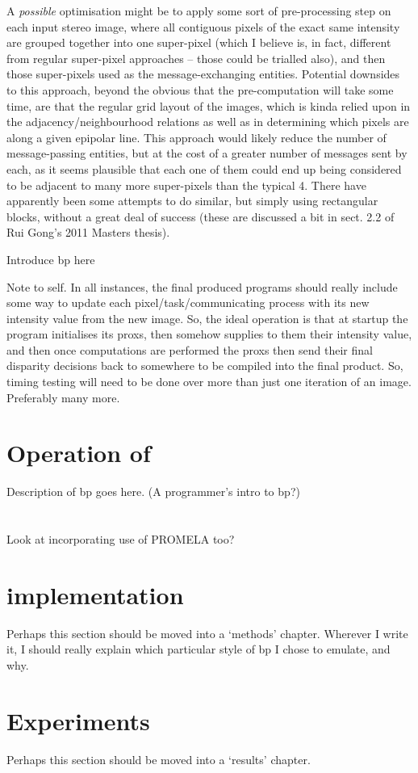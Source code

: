 A \emph{possible} optimisation might be to apply some sort of pre-processing step on each input stereo image, where all contiguous pixels of the exact same intensity are grouped together into one super-pixel (which I believe is, in fact, different from regular super-pixel approaches -- those could be trialled also), and then those super-pixels used as the message-exchanging entities.  Potential downsides to this approach, beyond the obvious that the pre-computation will take some time, are that the regular grid layout of the images, which is kinda relied upon in the adjacency/neighbourhood relations as well as in determining which pixels are along a given epipolar line.  This approach would likely reduce the number of message-passing entities, but at the cost of a greater number of messages sent by each, as it seems plausible that each one of them could end up being considered to be adjacent to many more super-pixels than the typical 4.  There have apparently been some attempts to do similar, but simply using rectangular blocks, without a great deal of success (these are discussed a bit in sect. 2.2 of Rui Gong's 2011 Masters thesis).

Introduce \gls{bp} here

Note to self.  In all instances, the final produced programs should really include some way to update each pixel/task/communicating process with its new intensity value from the new image.  So, the ideal operation is that at startup the program initialises its \glspl{prox}, then somehow supplies to them their intensity value, and then once computations are performed the \glspl{prox} then send their final disparity decisions back to somewhere to be compiled into the final product.  So, timing testing will need to be done over more than just one iteration of an image.  Preferably many more.

\section{Operation of }
Description of \gls{bp} goes here.  (A programmer's intro to \gls{bp}?)

\section{}


Look at incorporating use of PROMELA too?

\section{ implementation}

Perhaps this section should be moved into a `methods' chapter.  Wherever I write it, I should really explain which particular style of \gls{bp} I chose to emulate, and why.

\section{Experiments}

Perhaps this section should be moved into a `results' chapter.